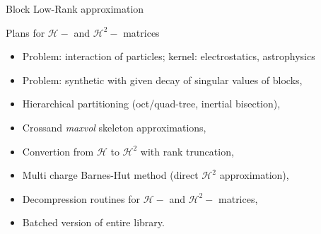 \documentclass{beamer}
\begin{document}
\begin{frame}{Block Low-Rank approximation}
\lst
\end{frame}

\begin{frame}{Plans for $\mathcal{H}-$ and $\mathcal{H}^2-$ matrices}
\begin{itemize}
\item Problem: interaction of particles; kernel: electrostatics, astrophysics
\item Problem: synthetic with given decay of singular values of blocks,
\item Hierarchical partitioning (oct/quad-tree, inertial bisection),
\item Crossand \emph{maxvol} skeleton approximations,
\item Convertion from $\mathcal{H}$ to $\mathcal{H}^2$ with rank truncation,
\item Multi charge Barnes-Hut method (direct $\mathcal{H}^2$ approximation),
\item Decompression routines for $\mathcal{H}-$ and $\mathcal{H}^2-$ matrices,
\item Batched version of entire library.
\end{itemize}
\end{frame}
\end{document}
